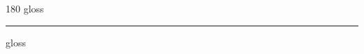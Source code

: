 
\begin{frame}
\begin{center}
\begin{turn}{180}
{\fontsize{2.5cm}{1em}\selectfont gloss}
\end{turn}
\vspace{1em}\par  
\hrule
\vspace{1em}\par  
{\fontsize{2.5cm}{1em}\selectfont gloss}
\end{center}
\end{frame}
